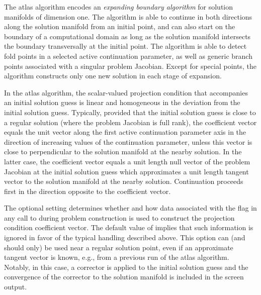 The  atlas algorithm encodes an \emph{expanding boundary algorithm} for solution manifolds of dimension one. The algorithm is able to continue in both directions along the solution manifold from an initial point, and can also start on the boundary of a computational domain as long as the solution manifold intersects the boundary transversally at the initial point. The algorithm is able to detect fold points in a selected active continuation parameter, as well as generic branch points associated with a singular problem Jacobian. Except for special points, the algorithm constructs only one new solution in each stage of expansion.

In the  atlas algorithm, the scalar-valued projection condition that accompanies an initial solution guess is linear and homogeneous in the deviation from the initial solution guess. Typically, provided that the initial solution guess is close to a regular solution (where the problem Jacobian is full rank), the coefficient vector equals the unit vector along the first active continuation parameter axis in the direction of increasing values of the continuation parameter, unless this vector is close to perpendicular to the solution manifold at the nearby solution. In the latter case, the coefficient vector equals a unit length null vector of the problem Jacobian at the initial solution guess which approximates a unit length tangent vector to the solution manifold at the nearby solution. Continuation proceeds first in the direction opposite to the coefficient vector. 

The optional setting  determines whether and how data associated with the  flag in any call to  during problem construction is used to construct the projection condition coefficient vector. The default value of  implies that such information is ignored in favor of the typical handling described above. This option can (and should only) be used near a regular solution point, even if an approximate tangent vector is known, e.g., from a previous run of the atlas algorithm. Notably, in this case, a corrector is applied to the initial solution guess and the convergence of the corrector to the solution manifold is included in the screen output.

